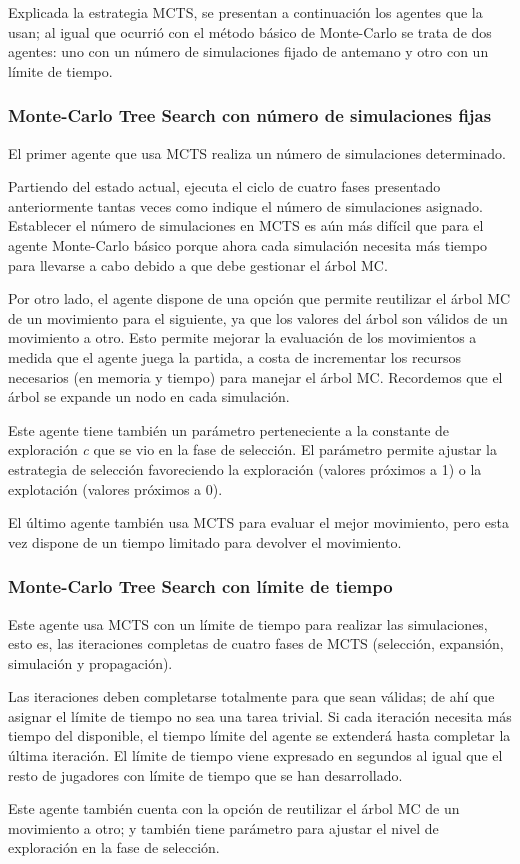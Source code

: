 \bigskip
Explicada la estrategia MCTS, se presentan a continuación los agentes que la usan; al igual que ocurrió con el método básico de Monte-Carlo se trata de dos agentes: uno con un número de simulaciones fijado de antemano y otro con un límite de tiempo.

\subsubsection{Monte-Carlo Tree Search con número de simulaciones fijas}
\label{sssec:montecarloTreeSearch_simulaciones}
El primer agente que usa MCTS realiza un número de simulaciones determinado.

Partiendo del estado actual, ejecuta el ciclo de cuatro fases presentado anteriormente tantas veces como indique el número de simulaciones asignado.
Establecer el número de simulaciones en MCTS es aún más difícil que para el agente Monte-Carlo básico porque ahora cada simulación necesita más tiempo para llevarse a cabo debido a que debe gestionar el árbol MC.

Por otro lado, el agente dispone de una opción que permite reutilizar el árbol MC de un movimiento para el siguiente, ya que los valores del árbol son válidos de un movimiento a otro.
Esto permite mejorar la evaluación de los movimientos a medida que el agente juega la partida, a costa de incrementar los recursos necesarios (en memoria y tiempo) para manejar el árbol MC.
Recordemos que el árbol se expande un nodo en cada simulación.

Este agente tiene también un parámetro perteneciente a la constante de exploración \textit{c} que se vio en la fase de selección.
El parámetro permite ajustar la estrategia de selección favoreciendo la exploración (valores próximos a 1) o la explotación (valores próximos a 0).

El último agente también usa MCTS para evaluar el mejor movimiento, pero esta vez dispone de un tiempo limitado para devolver el movimiento.

\subsubsection{Monte-Carlo Tree Search con límite de tiempo}
\label{sssec:montecarloTreeSearch_limiteTiempo}
Este agente usa MCTS con un límite de tiempo para realizar las simulaciones, esto es, las iteraciones completas de cuatro fases de MCTS (selección, expansión, simulación y propagación).

Las iteraciones deben completarse totalmente para que sean válidas; de ahí que asignar el límite de tiempo no sea una tarea trivial.
Si cada iteración necesita más tiempo del disponible, el tiempo límite del agente se extenderá hasta completar la última iteración.
El límite de tiempo viene expresado en segundos al igual que el resto de jugadores con límite de tiempo que se han desarrollado.

Este agente también cuenta con la opción de reutilizar el árbol MC de un movimiento a otro; y también tiene parámetro para ajustar el nivel de exploración en la fase de selección.
